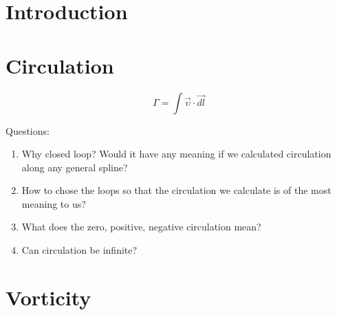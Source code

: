 \documentclass[12pt]{article}
\begin{document}

\setlength{\parindent}{0cm}

\clearpage


\tableofcontents



\setlength{\parskip}{1em}
\renewcommand{\baselinestretch}{1.0}


\newpage


\section{Introduction} \label{chap:intro}



\section{Circulation}

\begin{equation}
\Gamma = \int \vec{\upsilon} \cdot \vec{dl}
\end{equation}

Questions:

\begin{enumerate}
\item Why closed loop? Would it have any meaning if we calculated circulation along any general spline?

\item How to chose the loops so that the circulation we calculate is of the most meaning to us?

\item What does the zero, positive, negative circulation mean?

\item Can circulation be infinite?

\end{enumerate}



\section{Vorticity}


\newpage

\begin{thebibliography}{50}



\end{thebibliography}
\end{document}

